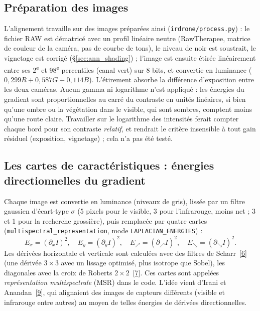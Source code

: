 \documentclass[a4paper,11pt]{report}
\begin{document}
\subsection{Préparation des images}\label{sec:ann_preparation}
L'alignement travaille sur des images préparées ainsi (\texttt{irdrone/process.py}) : le fichier RAW est dématricé avec un profil linéaire neutre (RawTherapee, matrice de couleur de la caméra, pas de courbe de tons), le niveau de noir est soustrait, le vignetage est corrigé (§\ref{sec:ann_shading}) ; l'image est ensuite étirée linéairement entre ses 2\textsuperscript{e} et 98\textsuperscript{e} percentiles (canal vert) sur 8 bits, et convertie en luminance ($0{,}299R + 0{,}587G + 0{,}114B$). L'étirement absorbe la différence d'exposition entre les deux caméras. Aucun gamma ni logarithme n'est appliqué : les énergies du gradient sont proportionnelles au carré du contraste en unités linéaires, si bien qu'une ombre ou la végétation dans le visible, qui sont sombres, comptent moins qu'une route claire. Travailler sur le logarithme des intensités ferait compter chaque bord pour son contraste \emph{relatif}, et rendrait le critère insensible à tout gain résiduel (exposition, vignetage) ; cela n'a pas été testé.

\subsection{Les cartes de caractéristiques : énergies directionnelles du gradient}\label{sec:ann_msr}
Chaque image est convertie en luminance (niveaux de gris), lissée par un filtre gaussien d'écart-type $\sigma$ (5 pixels pour le visible, 3 pour l'infrarouge, moins net ; 3 et 1 pour la recherche grossière), puis remplacée par quatre cartes (\texttt{multispectral\_representation}, mode \texttt{LAPLACIAN\_ENERGIES}) :
\begin{equation}
	E_x = (\partial_x I)^2, \quad E_y = (\partial_y I)^2, \quad E_{\nearrow} = (\partial_{\nearrow} I)^2, \quad E_{\searrow} = (\partial_{\searrow} I)^2.
\end{equation}
Les dérivées horizontale et verticale sont calculées avec des filtres de Scharr~[\hyperref[ann_scharr]{6}] (une dérivée $3 \times 3$ avec un lissage optimisé, plus isotrope que Sobel), les diagonales avec la croix de Roberts $2 \times 2$~[\hyperref[ann_roberts]{7}]. Ces cartes sont appelées \emph{représentation multispectrale} (MSR) dans le code. L'idée vient d'Irani et Anandan~[\hyperref[ann_irani]{9}], qui alignaient des images de capteurs différents (visible et infrarouge entre autres) au moyen de telles énergies de dérivées directionnelles.
\end{document}
